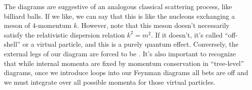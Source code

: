 The diagrams are suggestive of an analogous classical scattering process, like billiard balls. If we like, we can say that this is like the nucleons exchanging a meson of 4-momentum $k$. However, note that this meson doesn't necessarily satisfy the relativistic dispersion relation $k^2=m^2$. If it doesn't, it's called ``off-shell'' or a virtual particle, and this is a purely quantum effect. Conversely, the external legs of our diagram are forced to be . It's also important to recognize that while internal momenta are fixed by momentum conservation in ``tree-level'' diagrams, once we introduce loops into our Feynman diagrams all bets are off and we must integrate over all possible momenta for those virtual particles.